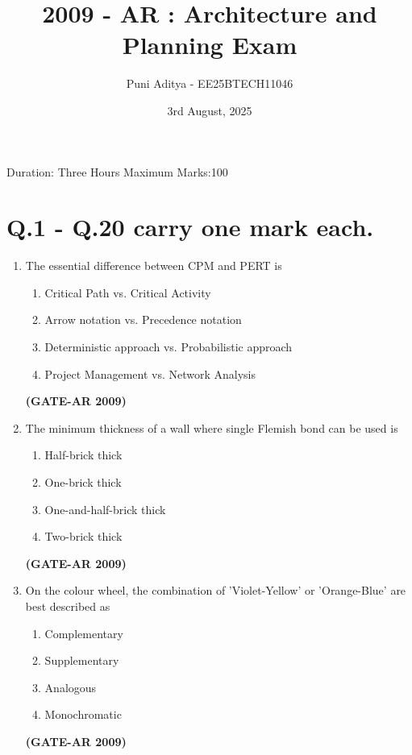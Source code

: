 \documentclass[a4paper,10pt]{article}
\begin{document}
\title{2009 - AR : Architecture and Planning Exam}
\author{Puni Aditya - EE25BTECH11046}
\date{3rd August, 2025}
\maketitle
Duration: Three Hours \hfill Maximum Marks:100

\section*{Q.1 - Q.20 carry one mark each.}

\begin{enumerate}
    \item The essential difference between CPM and PERT is 
    \begin{enumerate}
        \item Critical Path vs. Critical Activity
        \item Arrow notation vs. Precedence notation
        \item Deterministic approach vs. Probabilistic approach
        \item Project Management vs. Network Analysis
    \end{enumerate}
    \hfill \textbf{(GATE-AR 2009)}
    
    \item The minimum thickness of a wall where single Flemish bond can be used is 
    \begin{enumerate}
        \item Half-brick thick
        \item One-brick thick
        \item One-and-half-brick thick
        \item Two-brick thick
    \end{enumerate}
    \hfill \textbf{(GATE-AR 2009)}
    
    \item On the colour wheel, the combination of 'Violet-Yellow' or 'Orange-Blue' are best described as 
    \begin{multicols}{4}
	\begin{enumerate}
        \item Complementary
        \item Supplementary
        \item Analogous
        \item Monochromatic
    \end{enumerate}
	\end{multicols}
    \hfill \textbf{(GATE-AR 2009)}
    

\end{enumerate}
\end{document}
